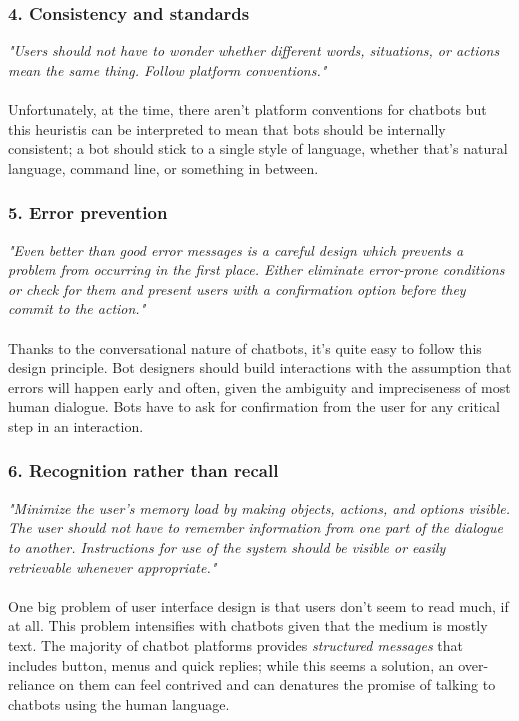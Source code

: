 \documentclass[b5paper,10pt,twoside,cucitura]{toptesi}
\begin{document}
\subsubsection{4. Consistency and standards}
\textit{"Users should not have to wonder whether different words, situations, or actions mean the same thing. Follow platform conventions."}
\\
\\
Unfortunately, at the time, there aren't platform conventions for chatbots but this heuristis can be interpreted to mean that bots should be internally consistent; a bot should stick to a single style of language, whether that’s natural language, command line, or something in between.

\subsubsection{5. Error prevention}
\textit{"Even better than good error messages is a careful design which prevents a problem from occurring in the first place. Either eliminate error-prone conditions or check for them and present users with a confirmation option before they commit to the action."}
\\
\\
Thanks to the conversational nature of chatbots, it's quite easy to follow this design principle.
Bot designers should build interactions with the assumption that errors will happen early and often, given the ambiguity and impreciseness of most human dialogue. Bots have to ask for confirmation from the user for any critical step in an interaction.

\subsubsection{6. Recognition rather than recall}
\textit{"Minimize the user’s memory load by making objects, actions, and options visible. The user should not have to remember information from one part of the dialogue to another. Instructions for use of the system should be visible or easily retrievable whenever appropriate."}
\\
\\
One big problem of user interface design is that users don't seem to read much, if at all. This problem intensifies with chatbots given that the medium is mostly text. The majority of chatbot platforms provides \textit{structured messages} that includes button, menus and quick replies; while this seems a solution, an over-reliance on them can feel contrived and can denatures the promise of talking to chatbots using the human language.
\end{document}
